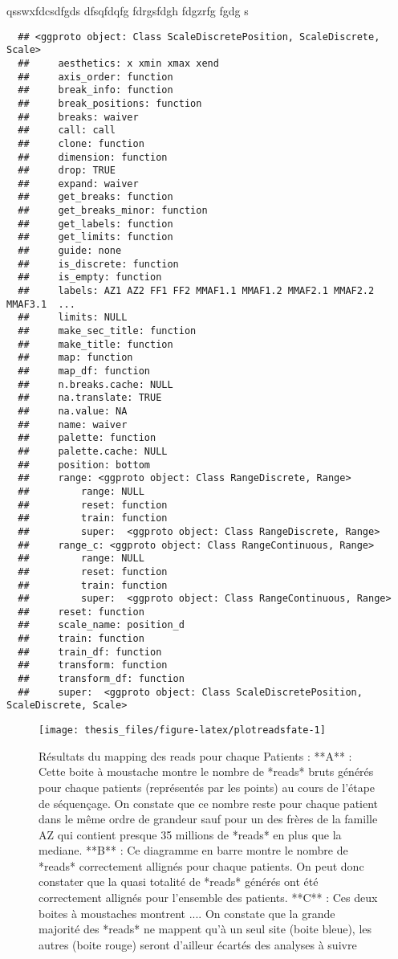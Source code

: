\documentclass[12pt,twoside]{reedthesis}
\theoremstyle{definition}
\theoremstyle{definition}
\theoremstyle{remark}
\begin{document}
  qsswxfdcsdfgds dfsqfdqfg fdrgsfdgh fdgzrfg fgdg s
  
  \begin{verbatim}
  ## <ggproto object: Class ScaleDiscretePosition, ScaleDiscrete, Scale>
  ##     aesthetics: x xmin xmax xend
  ##     axis_order: function
  ##     break_info: function
  ##     break_positions: function
  ##     breaks: waiver
  ##     call: call
  ##     clone: function
  ##     dimension: function
  ##     drop: TRUE
  ##     expand: waiver
  ##     get_breaks: function
  ##     get_breaks_minor: function
  ##     get_labels: function
  ##     get_limits: function
  ##     guide: none
  ##     is_discrete: function
  ##     is_empty: function
  ##     labels: AZ1 AZ2 FF1 FF2 MMAF1.1 MMAF1.2 MMAF2.1 MMAF2.2 MMAF3.1  ...
  ##     limits: NULL
  ##     make_sec_title: function
  ##     make_title: function
  ##     map: function
  ##     map_df: function
  ##     n.breaks.cache: NULL
  ##     na.translate: TRUE
  ##     na.value: NA
  ##     name: waiver
  ##     palette: function
  ##     palette.cache: NULL
  ##     position: bottom
  ##     range: <ggproto object: Class RangeDiscrete, Range>
  ##         range: NULL
  ##         reset: function
  ##         train: function
  ##         super:  <ggproto object: Class RangeDiscrete, Range>
  ##     range_c: <ggproto object: Class RangeContinuous, Range>
  ##         range: NULL
  ##         reset: function
  ##         train: function
  ##         super:  <ggproto object: Class RangeContinuous, Range>
  ##     reset: function
  ##     scale_name: position_d
  ##     train: function
  ##     train_df: function
  ##     transform: function
  ##     transform_df: function
  ##     super:  <ggproto object: Class ScaleDiscretePosition, ScaleDiscrete, Scale>
  \end{verbatim}
  
  \begin{figure}
  
  {\centering \texttt{[image: thesis\_files/figure-latex/plotreadsfate-1]} 
  
  }
  
  \caption[Résultats du mapping des reads pour chaque Patients]{Résultats du mapping des reads pour chaque Patients : **A** : Cette boite à moustache montre le nombre de *reads* bruts générés pour chaque patients (représentés par les points) au cours de l'étape de séquençage. On constate que ce nombre reste pour chaque patient dans le même ordre de grandeur sauf pour un des frères de la famille AZ  qui contient presque 35 millions de *reads* en plus que la mediane. **B** : Ce diagramme en barre montre le nombre de *reads* correctement allignés pour chaque patients. On peut donc constater que la quasi totalité de *reads* générés ont été correctement allignés pour l'ensemble des patients. **C** : Ces deux boites à moustaches montrent .... On constate que la grande majorité des *reads* ne mappent qu'à un seul site (boite bleue), les autres (boite rouge) seront d'ailleur écartés des analyses à suivre}\label{fig:plotreadsfate}
  \end{figure}
  
\end{document}
